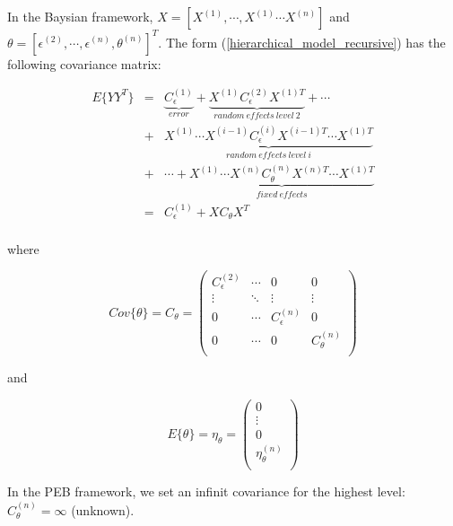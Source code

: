 \documentclass[final, paper=letter,5p,times,twocolumn]{elsarticle}
\theoremstyle{definition}
\begin{document}
In the Baysian framework, $X = [X^{(1)}, \cdots, X^{(1)} \cdots X^{(n)}]$ and $\theta = [\epsilon^{(2)}, \cdots, \epsilon^{(n)}, \theta^{(n)}]^{T}$. The form (\ref{hierarchical_model_recursive}) has the following covariance matrix:

\begin{equation}
  \left .
  \begin{array}{rcl}
    E\{YY^{T}\} & = & \underset{error}{\underbrace{C_{\epsilon}^{(1)}}} +  \underset{random~effects~level~2}{\underbrace{X^{(1)} C_{\epsilon}^{(2)} X^{(1)T}}} + \cdots \\
    & + & \underset{random~effects~level~i}{\underbrace{X^{(1)} \cdots X^{(i-1)} C_{\epsilon}^{(i)} X^{(i-1)T} \cdots X^{(1)T}}}  \\
    & + & \cdots + \underset{fixed~effects}{\underbrace{X^{(1)} \cdots X^{(n)} C_{\theta}^{(n)}X^{(n)T} \cdots X^{(1)T}}} \\
    & = & C_{\epsilon}^{(1)} + XC_{\theta}X^{T} \\
  \end{array}
  \right .
  \label{hierarchical_cov_recursive}
\end{equation}

where

\begin{equation}
  Cov\{\theta\} = C_{\theta} = \left (
  \begin{array}{cccc}
   C_{\epsilon}^{(2)} & \cdots & 0 & 0\\
   \vdots & \ddots & \vdots & \vdots \\
   0 & \cdots & C_{\epsilon}^{(n)} & 0 \\
   0 & \cdots & 0 & C_{\theta}^{(n)}\\
  \end{array}
  \right )
  \label{C_theta}
\end{equation}

and

\begin{equation}
  E\{\theta\} = \eta_{\theta} = \left (
  \begin{array}{c}
   0 \\
   \vdots  \\
   0  \\
   \eta_{\theta}^{(n)}\\
  \end{array}
  \right )
  \label{eta_theta}
\end{equation}


In the PEB framework, we set an infinit covariance for the highest level: $C_{\theta}^{(n)} = \infty$ (unknown).
\end{document}
